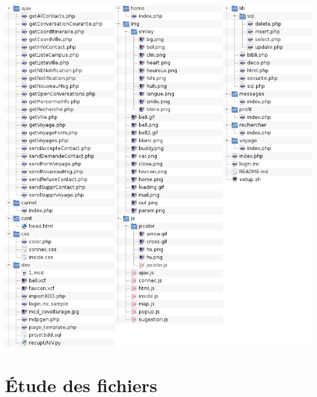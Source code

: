 \documentclass[a4paper,10pt]{report}
\begin{document}
\begin{center}
    \includegraphics[scale=0.7]{Arborescence2.png}
\end{center}

\section{\'Etude des fichiers}
\end{document}
